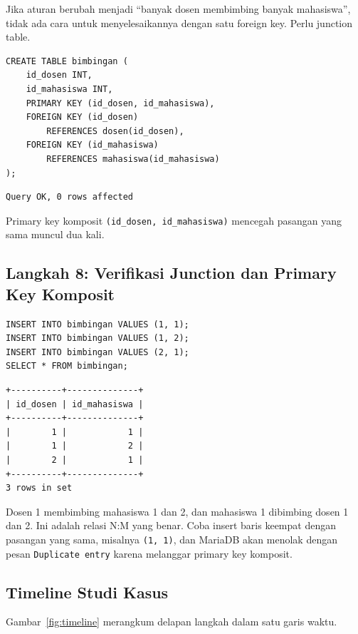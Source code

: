 \documentclass[11pt,a4paper]{article}
\begin{document}
Jika aturan berubah menjadi ``banyak dosen membimbing banyak mahasiswa'', tidak ada cara untuk menyelesaikannya dengan satu foreign key. Perlu junction table.

\begin{lstlisting}[style=code]
CREATE TABLE bimbingan (
    id_dosen INT,
    id_mahasiswa INT,
    PRIMARY KEY (id_dosen, id_mahasiswa),
    FOREIGN KEY (id_dosen)
        REFERENCES dosen(id_dosen),
    FOREIGN KEY (id_mahasiswa)
        REFERENCES mahasiswa(id_mahasiswa)
);
\end{lstlisting}

\begin{lstlisting}[style=out]
Query OK, 0 rows affected
\end{lstlisting}

Primary key komposit \texttt{(id\_dosen, id\_mahasiswa)} mencegah pasangan yang sama muncul dua kali.

\subsection{Langkah 8: Verifikasi Junction dan Primary Key Komposit}

\begin{lstlisting}[style=code]
INSERT INTO bimbingan VALUES (1, 1);
INSERT INTO bimbingan VALUES (1, 2);
INSERT INTO bimbingan VALUES (2, 1);
SELECT * FROM bimbingan;
\end{lstlisting}

\begin{lstlisting}[style=out]
+----------+--------------+
| id_dosen | id_mahasiswa |
+----------+--------------+
|        1 |            1 |
|        1 |            2 |
|        2 |            1 |
+----------+--------------+
3 rows in set
\end{lstlisting}

Dosen 1 membimbing mahasiswa 1 dan 2, dan mahasiswa 1 dibimbing dosen 1 dan 2. Ini adalah relasi N:M yang benar. Coba insert baris keempat dengan pasangan yang sama, misalnya \texttt{(1, 1)}, dan MariaDB akan menolak dengan pesan \texttt{Duplicate entry} karena melanggar primary key komposit.

\subsection{Timeline Studi Kasus}

Gambar~\ref{fig:timeline} merangkum delapan langkah dalam satu garis waktu.
\end{document}
